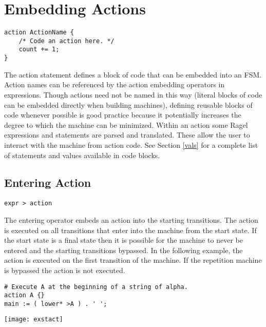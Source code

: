 \documentclass[letterpaper,11pt,oneside]{book}
\newcommand{\verbspace}{\vspace{10pt}}
\newcommand{\graphspace}{\vspace{10pt}}
\newenvironment{inline_code}{\def\baselinestretch{1}\vspace{12pt}\small}{}
\begin{document}
\section{Embedding Actions}

\begin{verbatim}
action ActionName {
    /* Code an action here. */
    count += 1;
}
\end{verbatim}
\verbspace

The action statement defines a block of code that can be embedded into an FSM.
Action names can be referenced by the action embedding operators in
expressions. Though actions need not be named in this way (literal blocks
of code can be embedded directly when building machines), defining reusable
blocks of code whenever possible is good practice because it potentially increases the
degree to which the machine can be minimized. Within an action some Ragel expressions
and statements are parsed and translated. These allow the user to interact with the machine
from action code. See Section \ref{vals} for a complete list of statements and
values available in code blocks. 

\subsection{Entering Action}

\verb|expr > action| 
\verbspace

The entering operator embeds an action into the starting transitions. The
action is executed on all transitions that enter into the machine from the
start state.  If the start state is a final state then it is possible for the
machine to never be entered and the starting transitions bypassed.  In the
following example, the action is executed on the first transition of the
machine. If the repetition machine is bypassed the action is not executed.

\verbspace

% GENERATE: exstact
\begin{inline_code}
\begin{verbatim}
# Execute A at the beginning of a string of alpha.
action A {}
main := ( lower* >A ) . ' ';
\end{verbatim}
\end{inline_code}

\graphspace
\begin{center}
\texttt{[image: exstact]}
\end{center}
\graphspace
\end{document}
